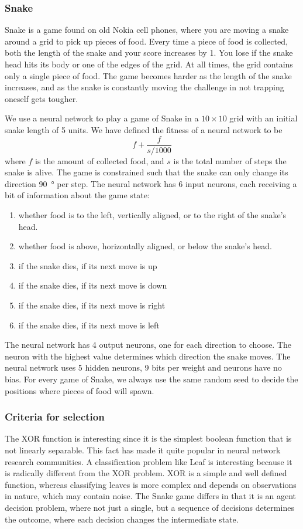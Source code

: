 \subsubsection{Snake}
Snake is a game found on old Nokia cell phones, where you are moving a snake around a grid to pick up pieces of food.
Every time a piece of food is collected, both the length of the snake and your score increases by 1.
You lose if the snake head hits its body or one of the edges of the grid.
At all times, the grid contains only a single piece of food.
The game becomes harder as the length of the snake increases, and as the snake is constantly moving the challenge in not trapping oneself gets tougher.

We use a neural network to play a game of Snake in a $10\times10$ grid with an initial snake length of 5 units.
We have defined the fitness of a neural network to be 
\[
  f + \frac{f}{s/1000}
\]
where $f$ is the amount of collected food, and $s$ is the total number of steps the snake is alive. The game is constrained such that the snake can only change its direction \SI{90}{\degree} per step. The neural network has 6 input neurons, each receiving a bit of information about the game state:
\begin{enumerate}
  \item {} whether food is to the left, vertically aligned, or to the right of the snake's head.
  \item {} whether food is above, horizontally aligned, or below the snake's head.
  \item {} if the snake dies, if its next move is up
  \item {} if the snake dies, if its next move is down
  \item {} if the snake dies, if its next move is right 
  \item {} if the snake dies, if its next move is left
\end{enumerate}
The neural network has 4 output neurons, one for each direction to choose. The neuron with the highest value determines which direction the snake moves.
The neural network uses 5 hidden neurons, 9 bits per weight and neurons have no bias.
For every game of Snake, we always use the same random seed to decide the positions where pieces of food will spawn.

\subsubsection{Criteria for selection}
The XOR function is interesting since it is the simplest boolean function that is not linearly separable. This fact has made it quite popular in neural network research communities\cite{masterThesisGANN}. A classification problem like Leaf is interesting because it is radically different from the XOR problem. XOR is a simple and well defined function, whereas classifying leaves is more complex and depends on observations in nature, which may contain noise. The Snake game differs in that it is an agent decision problem, where not just a single, but a sequence of decisions determines the outcome, where each decision changes the intermediate state.
